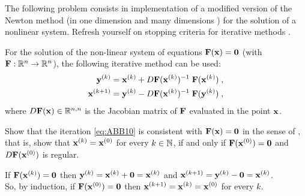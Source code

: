 \renewcommand{\chpt}{ch_iterativenlse}

\begin{problem} \label{prb:ModifiedNewton}

The following problem consists in \Eigen{} implementation of a modified version of the Newton method (in one dimension  and many dimensions ) for the solution of a nonlinear system. Refresh yourself on stopping criteria for iterative methods .

For the solution of the non-linear system of equations ${\mathbf{F}}({\mathbf{x}}) = {\mathbf{0}}$ (with ${\mathbf{F}}:\mathbb{R}^n\rightarrow\mathbb{R}^n$), the following iterative method can be used:
\begin{equation}  \label{eq:ABB10}
\begin{aligned}
{\mathbf{y}}^{(k)}   & = {\mathbf{x}}^{(k)} + D{\mathbf{F}}({\mathbf{x}}^{(k)})^{-1}\;{\mathbf{F}}({\mathbf{x}}^{(k)})\;,\\
{\mathbf{x}}^{(k+1)} & = {\mathbf{y}}^{(k)} - D{\mathbf{F}}({\mathbf{x}}^{(k)})^{-1}\;{\mathbf{F}}({\mathbf{y}}^{(k)})\;,
\end{aligned}
\end{equation}
where $D{\mathbf{F}}({\mathbf{x}})\in\mathbb{R}^{n,n}$ is the Jacobian matrix of ${\mathbf{F}}$ evaluated in the point ${\mathbf{x}}$.

\begin{subproblem}[2] \label{subprb:ModifiedNewton_1} Show that the iteration
  \eqref{eq:ABB10} is consistent with {${\mathbf{F}}({\mathbf{x}})={\mathbf{0}}$} in the sense of
  , that is, show that ${\mathbf{x}}^{(k)} = {\mathbf{x}}^{(0)}$ for every $k\in\mathbb{N}$, if and only if
  ${\mathbf{F}}({\mathbf{x}}^{(0)}) = {\mathbf{0}}$ and $D{\mathbf{F}}({\mathbf{x}}^{(0)})$ is regular.

% 
% 

\begin{solution}
If ${\mathbf{F}}({\mathbf{x}}^{(k)})={\mathbf{0}}$ then ${\mathbf{y}}^{(k)}={\mathbf{x}}^{(k)}+{\mathbf{0}}={\mathbf{x}}^{(k)}$ and ${\mathbf{x}}^{(k+1)}={\mathbf{y}}^{(k)}-{\mathbf{0}}={\mathbf{x}}^{(k)}$.\\
So, by induction, if ${\mathbf{F}}({\mathbf{x}}^{(0)})={\mathbf{0}}$ then ${\mathbf{x}}^{(k+1)}={\mathbf{x}}^{(k)}={\mathbf{x}}^{(0)}$ for every $k$.


\end{solution}
\end{subproblem}
\end{problem}
